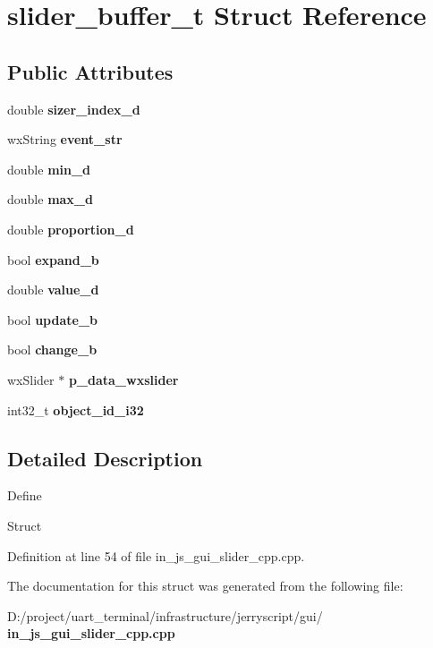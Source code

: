 \section{slider\+\_\+buffer\+\_\+t Struct Reference}
\label{structslider__buffer__t}
\subsection*{Public Attributes}
\begin{DoxyCompactItemize}
\item 
\mbox{\label{structslider__buffer__t_a10511134b5eaede1e966e569c7fe788c}} 
double {\bfseries sizer\+\_\+index\+\_\+d}
\item 
\mbox{\label{structslider__buffer__t_a3d911c343b251323f0638fac84fc1c91}} 
wx\+String {\bfseries event\+\_\+str}
\item 
\mbox{\label{structslider__buffer__t_a2824fa0ab737c151bf5b5fd8626f2353}} 
double {\bfseries min\+\_\+d}
\item 
\mbox{\label{structslider__buffer__t_a90c6dc1e3e0d46ba0e3cd55f2d8bb951}} 
double {\bfseries max\+\_\+d}
\item 
\mbox{\label{structslider__buffer__t_a74bb835989c5c2e8d4eb7dc496d5f6b5}} 
double {\bfseries proportion\+\_\+d}
\item 
\mbox{\label{structslider__buffer__t_aff3d8befb0fbff0e919b7d958df713cf}} 
bool {\bfseries expand\+\_\+b}
\item 
\mbox{\label{structslider__buffer__t_af6062152447910636c4e8407182d6bd3}} 
double {\bfseries value\+\_\+d}
\item 
\mbox{\label{structslider__buffer__t_a2ca554d352c2be2cf72523b900b680bc}} 
bool {\bfseries update\+\_\+b}
\item 
\mbox{\label{structslider__buffer__t_ac4733bebb629fa41e34acc1ee67631e2}} 
bool {\bfseries change\+\_\+b}
\item 
\mbox{\label{structslider__buffer__t_a0412d0a5d4a3f229df9ff5f2fea358c1}} 
wx\+Slider $\ast$ {\bfseries p\+\_\+data\+\_\+wxslider}
\item 
\mbox{\label{structslider__buffer__t_a5d2ac65d8619e3e1170267ec0e1974b6}} 
int32\+\_\+t {\bfseries object\+\_\+id\+\_\+i32}
\end{DoxyCompactItemize}


\subsection{Detailed Description}
Define

Struct 

Definition at line 54 of file in\+\_\+js\+\_\+gui\+\_\+slider\+\_\+cpp.\+cpp.



The documentation for this struct was generated from the following file\+:\begin{DoxyCompactItemize}
\item 
D\+:/project/uart\+\_\+terminal/infrastructure/jerryscript/gui/\textbf{ in\+\_\+js\+\_\+gui\+\_\+slider\+\_\+cpp.\+cpp}\end{DoxyCompactItemize}
